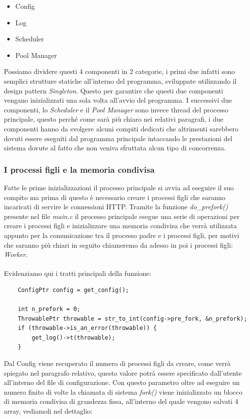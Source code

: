 \documentclass[italian]{tktltiki2}
\begin{document}
\begin{itemize}
	\item Config
	\item Log
	\item Scheduler
	\item Pool Manager
\end{itemize}
Possiamo dividere questi 4 componenti in 2 categorie, i primi due infatti sono semplici strutture statiche all'interno del programma, sviluppate utilizzando il design pattern \emph{Singleton}. Questo per garantire che questi due componenti vengano inizializzati una sola volta all'avvio del programma. I successivi due componenti, lo \emph{Scheduler} e il \emph{Pool Manager} sono invece thread del processo principale, questo perché come sarà più chiaro nei relativi paragrafi, i due componenti hanno da svolgere alcuni compiti dedicati che altrimenti sarebbero dovuti essere eseguiti dal programma principale intaccando le prestazioni del sistema dovute al fatto che non veniva sfruttata alcun tipo di concorrenza.

\subsubsection{I processi figli e la memoria condivisa}
\label{ssec:child_process}
Fatte le prime inizializzazioni il processo principale si avvia ad eseguire il suo compito ma prima di questo è necessario creare i processi figli che saranno incaricati di servire le connessioni HTTP. Tramite la funzione \emph{do\_prefork()} presente nel file \emph{main.c} il processo principale esegue una serie di operazioni per creare i processi figli e inizializzare una memoria condivisa che verrà utilizzata appunto per la comunicazione tra il processo padre e i processi figli, per motivi che saranno più chiari in seguito chiameremo da adesso in poi i processi figli: \emph{Worker}. \\\\Evidenziamo qui i tratti principali della funzione:

\begin{lstlisting}
    ConfigPtr config = get_config();
    
    int n_prefork = 0;
    ThrowablePtr throwable = str_to_int(config->pre_fork, &n_prefork);
    if (throwable->is_an_error(throwable)) {
        get_log()->t(throwable);
    }
\end{lstlisting}
Dal Config viene recuperato il numero di processi figli da creare, come verrà spiegato nel paragrafo relativo, questo valore potrà essere specificato dall'utente all'interno del file di configurazione. Con questo parametro oltre ad eseguire un numero finito di volte la chiamata di sistema \emph{fork()} viene inizializzato un blocco di memoria condivisa di grandezza fissa, all'interno del quale vengono salvati 4 array, vediamoli nel dettaglio:
\end{document}

